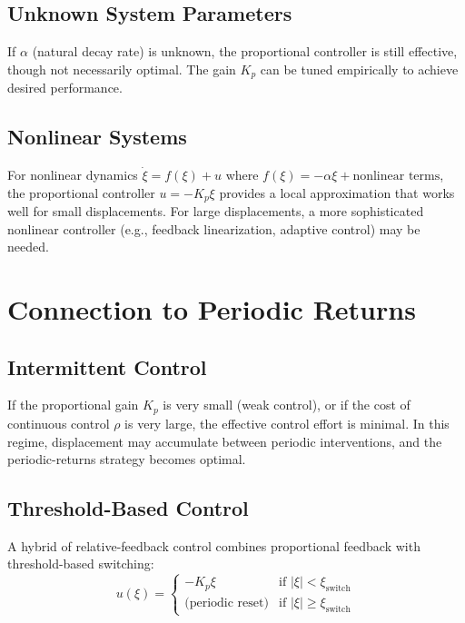 \documentclass[12pt]{article}
\begin{document}
\subsection{Unknown System Parameters}

If $\alpha$ (natural decay rate) is unknown, the proportional controller is still effective, though not necessarily optimal. The gain $K_p$ can be tuned empirically to achieve desired performance.

\subsection{Nonlinear Systems}

For nonlinear dynamics $\dot{\xi} = f(\xi) + u$ where $f(\xi) = -\alpha \xi + \text{nonlinear terms}$, the proportional controller $u = -K_p \xi$ provides a local approximation that works well for small displacements. For large displacements, a more sophisticated nonlinear controller (e.g., feedback linearization, adaptive control) may be needed.

\section{Connection to Periodic Returns}

\subsection{Intermittent Control}

If the proportional gain $K_p$ is very small (weak control), or if the cost of continuous control $\rho$ is very large, the effective control effort is minimal. In this regime, displacement may accumulate between periodic interventions, and the periodic-returns strategy becomes optimal.

\subsection{Threshold-Based Control}

A hybrid of relative-feedback control combines proportional feedback with threshold-based switching:
\begin{equation}
u(\xi) = \begin{cases}
-K_p \xi & \text{if } |\xi| < \xi_{\text{switch}} \\
\text{(periodic reset)} & \text{if } |\xi| \geq \xi_{\text{switch}}
\end{cases}
\end{equation}
\end{document}
